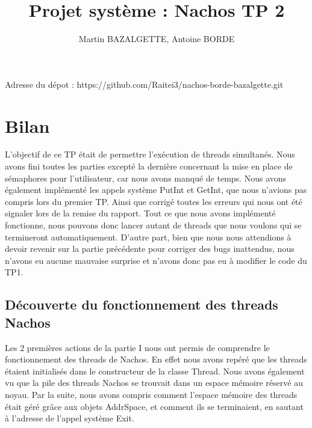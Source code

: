 \documentclass[11pt]{article}
\begin{document}
\title{Projet système : Nachos TP 2}
\author{Martin BAZALGETTE, Antoine BORDE}
\maketitle
Adresse du dépot : https://github.com/Raitei3/nachos-borde-bazalgette.git
\newpage
\tableofcontents
\newpage




\section{Bilan}

L'objectif de ce TP était de permettre l'exécution de threads simultanés.
Nous avons fini toutes les parties excepté la dernière concernant la mise en place de sémaphores pour l'utilisateur, car nous avons manqué de temps.
Nous avons également implémenté les appels système \textcolor{blue2}{PutInt} et \textcolor{blue2}{GetInt},
que nous n'avions pas compris lors du premier TP. Ainsi que corrigé toutes les erreurs qui
nous ont été signaler lors de la remise du rapport.
\newline
Tout ce que nous avons implémenté fonctionne, nous pouvons donc lancer autant de threads que nous voulons qui se termineront automatiquement.
D'autre part, bien que nous nous attendions à devoir revenir sur la partie précédente pour corriger des bugs inattendus, nous n'avons eu aucune mauvaise surprise et n'avons donc pas eu à modifier le code du TP1.

\subsection{Découverte du fonctionnement des threads Nachos}
Les 2 premières actions de la partie I nous ont permis de comprendre le fonctionnement des threads de Nachos. En effet nous avons repéré que les threads étaient initialisés dans le constructeur de la classe Thread. Nous avons également vu que la pile des threads Nachos se trouvait dans un espace mémoire réservé au noyau.
Par la suite, nous avons compris comment l'espace mémoire des threads était géré grâce aux objets AddrSpace, et comment ils se terminaient, en sautant à l'adresse de l'appel système \textcolor{blue2}{Exit}.
\end{document}
